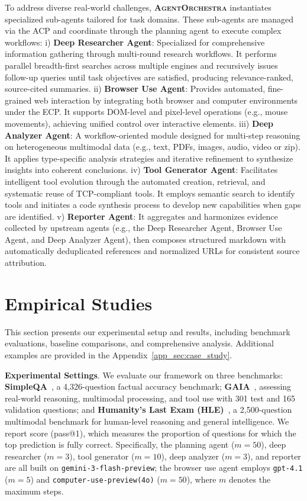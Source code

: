 \documentclass[11pt]{article}
\newcommand{\projectname}{\textbf{\textsc{AgentOrchestra}}\xspace}
\begin{document}
To address diverse real-world challenges, \projectname instantiates specialized sub-agents tailored for task domains. These sub-agents are managed via the ACP and coordinate through the planning agent to execute complex workflows: i) \textbf{Deep Researcher Agent}: Specialized for comprehensive information gathering through multi-round research workflows. It performs parallel breadth-first searches across multiple engines and recursively issues follow-up queries until task objectives are satisfied, producing relevance-ranked, source-cited summaries. ii) \textbf{Browser Use Agent}: Provides automated, fine-grained web interaction by integrating both browser and computer environments under the ECP. It supports DOM-level and pixel-level operations (e.g., mouse movements), achieving unified control over interactive elements. iii) \textbf{Deep Analyzer Agent}: A workflow-oriented module designed for multi-step reasoning on heterogeneous multimodal data (e.g., text, PDFs, images, audio, video or zip). It applies type-specific analysis strategies and iterative refinement to synthesize insights into coherent conclusions. iv) \textbf{Tool Generator Agent}: Facilitates intelligent tool evolution through the automated creation, retrieval, and systematic reuse of TCP-compliant tools. It employs semantic search to identify tools and initiates a code synthesis process to develop new capabilities when gaps are identified. v) \textbf{Reporter Agent}: It aggregates and harmonizes evidence collected by upstream agents (e.g., the Deep Researcher Agent, Browser Use Agent, and Deep Analyzer Agent), then composes structured markdown with automatically deduplicated references and normalized URLs for consistent source attribution.

\section{Empirical Studies}
\label{sec:empirical_studies}
This section presents our experimental setup and results, including benchmark evaluations, baseline comparisons, and comprehensive analysis. Additional examples are provided in the Appendix~\ref{app_sec:case_study}.

\textbf{Experimental Settings}. We evaluate our framework on three benchmarks: \textbf{SimpleQA}~\cite{wei2024measuringshortformfactualitylarge}, a 4,326-question factual accuracy benchmark; \textbf{GAIA}~\cite{mialon2023gaiabenchmarkgeneralai}, assessing real-world reasoning, multimodal processing, and tool use with 301 test and 165 validation questions; and \textbf{Humanity’s Last Exam (HLE)}~\cite{phan2025humanity}, a 2,500-question multimodal benchmark for human-level reasoning and general intelligence. We report score (pass@1), which measures the proportion of questions for which the top prediction is fully correct. 
Specifically, the planning agent (\(m{=}50\)), deep researcher  (\(m{=}3\)), tool generator (\(m{=}10\)), deep analyzer (\(m{=}3\)), and reporter are all built on \texttt{gemini-3-flash-preview}; the browser use agent employs \texttt{gpt-4.1} (\(m{=}5\)) and \texttt{computer-use-preview(4o)} (\(m{=}50\)), where \(m\) denotes the maximum steps.
\end{document}
